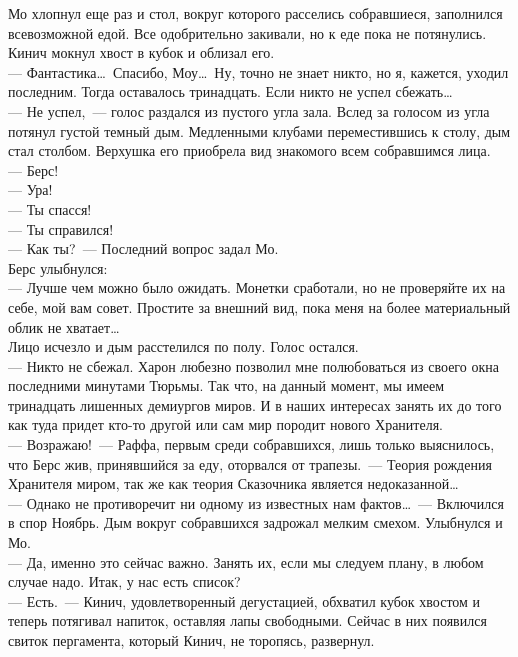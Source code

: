 Мо хлопнул еще раз и стол, вокруг которого расселись собравшиеся, заполнился 
всевозможной едой. Все одобрительно закивали, но к еде пока не потянулись. 
Кинич мокнул хвост в кубок и облизал его.\\
--- Фантастика\ldots\ Спасибо, Моу\ldots\ Ну, точно не знает никто, но я, 
кажется, уходил последним. Тогда оставалось тринадцать. Если никто не успел сбежать\ldots\\
--- Не успел,~--- голос раздался из пустого угла зала. Вслед за голосом из угла 
потянул густой темный дым. Медленными клубами переместившись к столу, дым стал 
столбом. Верхушка его приобрела вид знакомого всем собравшимся лица.\\
--- Берс!\\
--- Ура!\\
--- Ты спасся!\\
--- Ты справился!\\
--- Как ты?~--- Последний вопрос задал Мо.\\
Берс улыбнулся:\\
--- Лучше чем можно было ожидать. Монетки сработали, но не проверяйте их на себе, 
мой вам совет. Простите за внешний вид, пока меня на более материальный облик 
не хватает\ldots\\
Лицо исчезло и дым расстелился по полу. Голос остался.\\
--- Никто не сбежал. Харон любезно позволил мне полюбоваться из своего окна 
последними минутами Тюрьмы. Так что, на данный момент, мы имеем тринадцать 
лишенных демиургов миров. И в наших интересах занять их до того как туда придет 
кто-то другой или сам мир породит нового Хранителя.\\
--- Возражаю!~--- Раффа, первым среди собравшихся, лишь только выяснилось, что 
Берс жив, принявшийся за еду, оторвался от трапезы.~--- Теория рождения Хранителя 
миром, так же как теория Сказочника является недоказанной\ldots\\
--- Однако не противоречит ни одному из известных нам фактов\ldots~--- Включился 
в спор Ноябрь. Дым вокруг собравшихся задрожал мелким смехом. Улыбнулся и Мо.\\
--- Да, именно это сейчас важно. Занять их, если мы следуем плану, в любом случае 
надо. Итак, у нас есть список?\\
--- Есть.~--- Кинич, удовлетворенный дегустацией, обхватил кубок хвостом и теперь 
потягивал напиток, оставляя лапы свободными. Сейчас в них появился свиток 
пергамента, который Кинич, не торопясь, развернул.\\
